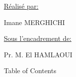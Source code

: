 \documentclass[12pt]{article}
\begin{document}
\vspace{\baselineskip}

\vspace{\baselineskip}

\vspace{\baselineskip}
\uline{Réalisé par:}\ \ \  \par

Imane MERGHICHI\par

\uline{Sous l’encadrement de:}\par

Pr. M. El HAMLAOUI\par

\newpage
Table of Contents\par

\par

\par

\par

\par

\par

\par

\par

\par

\par

\par

\par

\par

\par

\par

\par

\par


\vspace{\baselineskip}

\vspace{\baselineskip}

\vspace{\baselineskip}

\vspace{\baselineskip}
\end{document}
